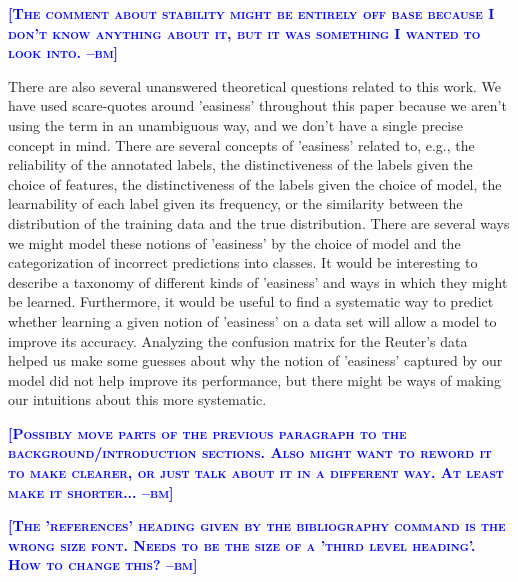 \documentclass{article} %
\newcommand{\bmcomment}[1]{\textcolor{blue}{\textsc{\textbf{[#1 --bm]}}}}
\begin{document}
\bmcomment{The comment about stability might be entirely off base
because I don't know anything about it, but it was something
I wanted to look into.}

There are also several unanswered theoretical questions related 
to this work.  We have used scare-quotes around 'easiness' throughout
this paper because we aren't using the term in an unambiguous way,
and we don't have a single precise concept in mind.  There are
several concepts of 'easiness' related to, e.g., the reliability 
of the annotated labels, the distinctiveness of the labels given the 
choice of features, the distinctiveness of the labels given
the choice of model, the learnability of each label given its
frequency, or the similarity between the distribution of the
training data and the true distribution. There are several ways we 
might model these notions of 'easiness' by the choice of 
model and the categorization of incorrect predictions into classes.
It would be interesting to describe a taxonomy of different kinds
of 'easiness' and ways in which they might be learned.  Furthermore,
it would be useful to find a systematic way to predict whether 
learning a given notion of 'easiness' on a data set will allow a model 
to improve its accuracy.  Analyzing the confusion matrix for the
Reuter's data helped us make some guesses about why the notion of 'easiness' 
captured by our model did not help improve its performance, but
there might be ways of making our intuitions about this more systematic.

\bmcomment{Possibly move parts of the previous paragraph to 
the background/introduction sections. Also might want to reword it to
make clearer, or just talk about it in a different way.  At least
make it shorter...}



\bmcomment{The 'references' heading given by the 
bibliography command is the wrong size font.  Needs to
be the size of a 'third level heading'.  How to change this?}


\end{document}
